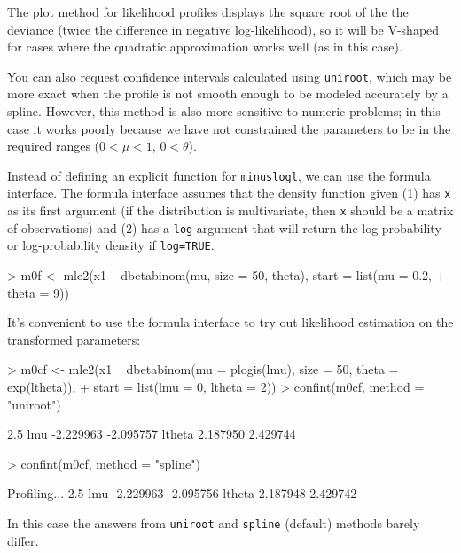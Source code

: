\documentclass{article}
\newcommand{\code}[1]{{\tt #1}}
\begin{document}
The plot method for 
likelihood profiles displays the square root of the
the deviance
(twice the difference in negative
log-likelihood), so it will
be {\sf V}-shaped
for cases where the quadratic approximation works well
(as in this case).

You can also request confidence intervals
calculated using \code{uniroot}, which may be more exact when
the profile is not smooth enough to be modeled accurately
by a spline.  However, this method is
also more sensitive to numeric problems; in this
case it works poorly because we have not constrained
the parameters to be in the required ranges
($0<\mu<1$, $0<\theta$).

Instead of defining an
explicit function for \code{minuslogl}, 
we can use the formula interface.
The formula interface assumes that
the density function given (1) has \code{x} as
its first argument (if the distribution is multivariate,
then \code{x} should be a matrix of observations)
and (2) has a \code{log} argument that will return
the log-probability or log-probability density
if \code{log=TRUE}.
\begin{Schunk}
\begin{Sinput}
> m0f <- mle2(x1 ~ dbetabinom(mu, size = 50, theta), start = list(mu = 0.2, 
+     theta = 9))
\end{Sinput}
\end{Schunk}

It's convenient to use the formula interface
to try out likelihood estimation on the
transformed parameters:
\begin{Schunk}
\begin{Sinput}
> m0cf <- mle2(x1 ~ dbetabinom(mu = plogis(lmu), size = 50, theta = exp(ltheta)), 
+     start = list(lmu = 0, ltheta = 2))
> confint(m0cf, method = "uniroot")
\end{Sinput}
\begin{Soutput}
           2.5 %
lmu    -2.229963 -2.095757
ltheta  2.187950  2.429744
\end{Soutput}
\begin{Sinput}
> confint(m0cf, method = "spline")
\end{Sinput}
\begin{Soutput}
Profiling...
           2.5 %
lmu    -2.229963 -2.095756
ltheta  2.187948  2.429742
\end{Soutput}
\end{Schunk}

In this case the answers from \code{uniroot}
and \code{spline} (default) methods barely
differ.
\end{document}
